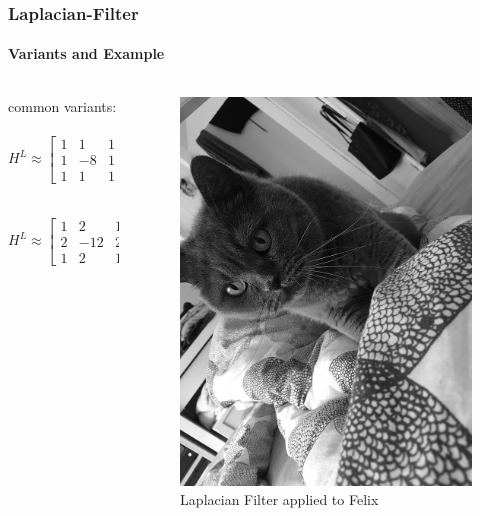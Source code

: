 \begin{frame}
	\frametitle{Laplacian-Filter}
	\framesubtitle{Variants and Example}
	\begin{columns}
		\begin{column}{0.5\textwidth}
			common variants: ~\newline ~\newline
			$H^L \approx \begin{bmatrix} 1 & 1 & 1\\ 1 & -8 & 1 \\ 1 & 1 & 1 \end{bmatrix}$
			
			~\newline ~\newline
			$H^L \approx \begin{bmatrix} 1 & 2 & 1\\2 & -12 & 2 \\ 1 & 2 & 1 \end{bmatrix}$
			
		\end{column}
		\begin{column}{0.5\textwidth}
			\begin{figure}
				\centering
				\includegraphics[width=0.7\linewidth]{images/KadseLaplace}
				\caption[FelixLaplace]{Laplacian Filter applied to Felix}
				\label{fig:kadselaplace}
			\end{figure}
		\end{column}
	\end{columns}
\end{frame}
